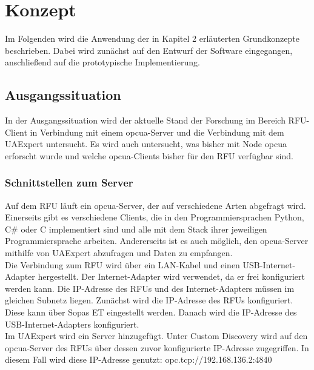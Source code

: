 




\chapter{Konzept}
Im Folgenden wird die Anwendung der in Kapitel 2 erläuterten Grundkonzepte beschrieben. Dabei wird zunächst auf den Entwurf der Software eingegangen, anschließend auf die prototypische Implementierung.\\

\section{Ausgangssituation}
In der Ausgangssituation wird der aktuelle Stand der Forschung im Bereich RFU-Client in Verbindung mit einem \ac{opcua}-Server und die Verbindung mit dem UAExpert untersucht. Es wird auch untersucht, was bisher mit Node \ac{opcua} erforscht wurde und welche \ac{opcua}-Clients bisher für den RFU verfügbar sind.

\subsection{Schnittstellen zum Server}
Auf dem RFU läuft ein \ac{opcua}-Server, der auf verschiedene Arten abgefragt wird. Einerseits gibt es verschiedene Clients, die in den Programmiersprachen Python, C\# oder C implementiert sind und alle mit dem Stack ihrer jeweiligen Programmiersprache arbeiten. Andererseits ist es auch möglich, den \ac{opcua}-Server mithilfe von UAExpert abzufragen und Daten zu empfangen.\\

Die Verbindung zum RFU wird über ein LAN-Kabel und einen USB-Internet-Adapter hergestellt. Der Internet-Adapter wird verwendet, da er frei konfiguriert werden kann. Die IP-Adresse des RFUs und des Internet-Adapters müssen im gleichen Subnetz liegen. Zunächst wird die IP-Adresse des RFUs konfiguriert. Diese kann über Sopas ET eingestellt werden. Danach wird die IP-Adresse des USB-Internet-Adapters konfiguriert.\\

Im UAExpert wird ein Server hinzugefügt. Unter \frqq Custom Discovery \flqq wird auf den \ac{opcua}-Server des RFUs über dessen zuvor konfigurierte IP-Adresse zugegriffen. In diesem Fall wird diese IP-Adresse genutzt: \frqq opc.tcp://192.168.136.2:4840 \flqq \\

